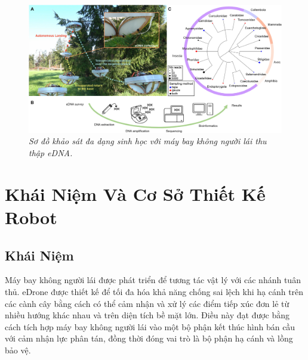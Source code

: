\documentclass[12pt,a4paper]{article}
\begin{document}
\newpage
\begin{figure}
    \centering
    \includegraphics[scale = 0.7]{hinh 1}
    \caption{\textit{Sơ đồ khảo sát đa dạng sinh học với máy bay không người lái thu thập eDNA.}}
    \label{fig1}
\end{figure} 
\section{Khái Niệm Và Cơ Sở Thiết Kế Robot}
\subsection{Khái Niệm}
Máy bay không người lái được phát triển để tương tác vật lý với các nhánh tuân thủ. eDrone được thiết kế để tối đa hóa khả năng chống sai lệch khi hạ cánh trên các cành cây bằng cách có thể cảm nhận và xử lý các điểm tiếp xúc đơn lẻ từ nhiều hướng khác nhau và trên diện tích bề mặt lớn. Điều này đạt được bằng cách tích hợp máy bay không người lái vào một bộ phận kết thúc hình bán cầu với cảm nhận lực phân tán, đồng thời đóng vai trò là bộ phận hạ cánh và lồng bảo vệ. 
\end{document}
